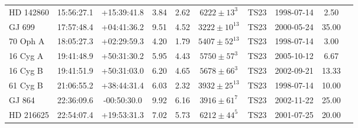 \begin{scriptsize}
\begin{longtable}{lcccccrccc}
    HD 142860 &   15:56:27.1 &   +15:39:41.8 &   3.84 &  2.62 &     $6222 \pm 13^{3}$ &        TS23 &      1998-07-14 &              2.50  \\
     GJ 699 &   17:57:48.4 &   +04:41:36.2 &   9.51 &  4.52 &    $3222 \pm 10^{13}$ &        TS23 &      2000-05-24 &             35.00  \\
   70 Oph A &   18:05:27.3 &   +02:29:59.3 &   4.20 &  1.79 &    $5407 \pm 52^{13}$ &        TS23 &      1998-07-14 &              3.00  \\
   16 Cyg A &   19:41:48.9 &   +50:31:30.2 &   5.95 &  4.43 &     $5750 \pm 57^{3}$ &        TS23 &      2005-10-12 &              6.67  \\
   16 Cyg B &   19:41:51.9 &   +50:31:03.0 &   6.20 &  4.65 &     $5678 \pm 66^{3}$ &        TS23 &      2002-09-21 &             13.33  \\
   61 Cyg B &   21:06:55.2 &   +38:44:31.4 &   6.03 &  2.32 &    $3932 \pm 25^{13}$ &        TS23 &      1998-07-14 &             10.00  \\
     GJ 864 &   22:36:09.6 &   -00:50:30.0 &   9.92 &  6.16 &     $3916 \pm 61^{7}$ &        TS23 &      2002-11-22 &             25.00  \\
  HD 216625 &   22:54:07.4 &   +19:53:31.3 &   7.02 &  5.73 &     $6212 \pm 44^{5}$ &        TS23 &      2001-07-25 &             20.00  \\

  
  
\end{longtable}
\end{scriptsize}





